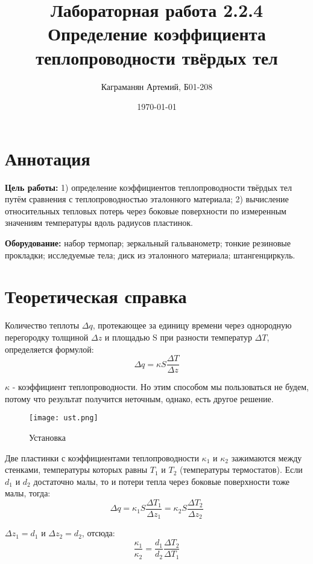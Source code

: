 \documentclass[a4paper, 12pt]{article}
\author{Каграманян Артемий, Б01-208}
\date{\today}
\title{Лабораторная работа 2.2.4\\ Определение коэффициента теплопроводности твёрдых тел }
\begin{document}
\maketitle

\section{Аннотация}
    \textbf{Цель работы:} 1) определение коэффициентов теплопроводности твёрдых тел путём сравнения с теплопроводностью эталонного материала; 2) вычисление относительных тепловых потерь через боковые поверхности по измеренным значениям температуры вдоль радиусов пластинок. 
    
    \textbf{Оборудование:} набор термопар; зеркальный гальванометр; тонкие резиновые прокладки; исследуемые тела; диск из эталонного материала; штангенциркуль.


\section {Теоретическая справка} 
    Количество теплоты $\Delta q$, протекающее за единицу времени через однородную перегородку толщиной $\Delta z$ и площадью S при разности температур $\Delta T$, определяется формулой:
    \begin{equation}
        \Delta q = \kappa S \dfrac{\Delta T}{\Delta z}    
    \end{equation}

    \(\kappa\) - коэффициент теплопроводности. Но этим способом мы пользоваться не будем, потому что результат получится неточным, однако, есть другое решение.

    \begin{figure}[H]
        \centering
        \texttt{[image: ust.png]}
        \caption{Установка}
    \end{figure}
    
    Две пластинки с коэффициентами теплопроводности $\kappa_1$ и $\kappa_2$ зажимаются между стенками, температуры которых равны $T_1$ и $T_2$ (температуры термостатов). Если  $d_1$ и $d_2$ достаточно малы, то и потери тепла через боковые поверхности тоже малы, тогда:
    \begin{equation}
        \Delta q = \kappa_1 S \dfrac{\Delta T_1}{\Delta z_1} = \kappa_2 S \dfrac{\Delta T_2}{\Delta z_2}
    \end{equation}

    $\Delta z_1 = d_1$ и $\Delta z_2 = d_2$, отсюда:
    \begin{equation}
        \dfrac{\kappa_1}{\kappa_2} = \dfrac{d_1}{d_2} \dfrac{\Delta T_2}{\Delta T_1}
    \end{equation}
\end{document}
